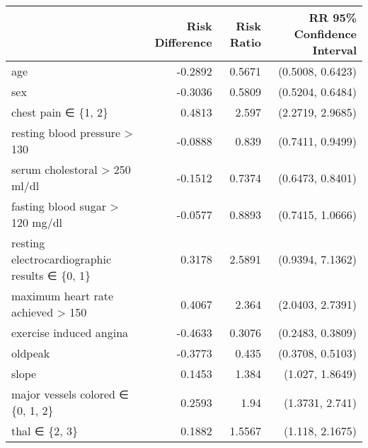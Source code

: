 \def\arraystretch{0.7}
\begin{tabular}{lrrr}
\toprule
{} & Risk Difference & Risk Ratio & RR 95\% Confidence Interval \\
\midrule
age                                           &         -0.2892 &     0.5671 &           (0.5008, 0.6423) \\
sex                                           &         -0.3036 &     0.5809 &           (0.5204, 0.6484) \\
chest pain ∈ \{1, 2\}                           &          0.4813 &      2.597 &           (2.2719, 2.9685) \\
resting blood pressure > 130                  &         -0.0888 &      0.839 &           (0.7411, 0.9499) \\
serum cholestoral > 250 ml/dl                 &         -0.1512 &     0.7374 &           (0.6473, 0.8401) \\
fasting blood sugar > 120 mg/dl               &         -0.0577 &     0.8893 &           (0.7415, 1.0666) \\
resting electrocardiographic results ∈ \{0, 1\} &          0.3178 &     2.5891 &           (0.9394, 7.1362) \\
maximum heart rate achieved > 150             &          0.4067 &      2.364 &           (2.0403, 2.7391) \\
exercise induced angina                       &         -0.4633 &     0.3076 &           (0.2483, 0.3809) \\
oldpeak                                       &         -0.3773 &      0.435 &           (0.3708, 0.5103) \\
slope                                         &          0.1453 &      1.384 &            (1.027, 1.8649) \\
major vessels colored ∈ \{0, 1, 2\}             &          0.2593 &       1.94 &            (1.3731, 2.741) \\
thal ∈ \{2, 3\}                                 &          0.1882 &     1.5567 &            (1.118, 2.1675) \\
\bottomrule
\end{tabular}
